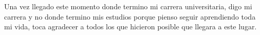 \begin{acknowledgements}

Una vez llegado este momento donde termino mi carrera universitaria, digo mi carrera y no donde termino mis estudios porque pienso seguir aprendiendo toda mi vida, toca agradecer a todos los que hicieron posible que llegara a este lugar.

\end{acknowledgements}